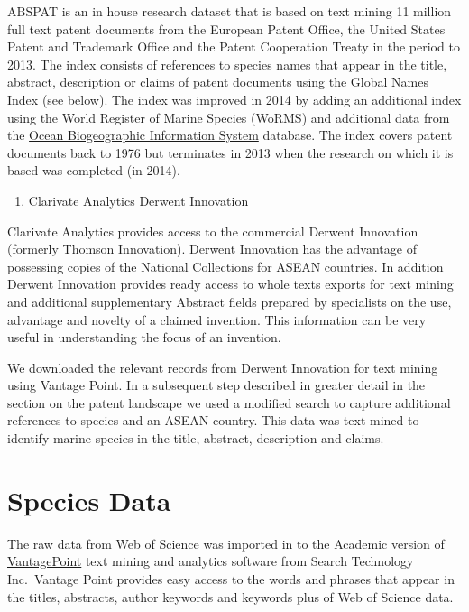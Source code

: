 \documentclass[]{book}
\providecommand{\tightlist}{%
  \setlength{\itemsep}{0pt}\setlength{\parskip}{0pt}}
\theoremstyle{definition}
\theoremstyle{definition}
\theoremstyle{definition}
\theoremstyle{remark}
\begin{document}
ABSPAT is an in house research dataset that is based on text mining 11
million full text patent documents from the European Patent Office, the
United States Patent and Trademark Office and the Patent Cooperation
Treaty in the period to 2013. The index consists of references to
species names that appear in the title, abstract, description or claims
of patent documents using the Global Names Index (see below). The index
was improved in 2014 by adding an additional index using the World
Register of Marine Species (WoRMS) and additional data from the
\href{http://www.iobis.org/}{Ocean Biogeographic Information System}
database. The index covers patent documents back to 1976 but terminates
in 2013 when the research on which it is based was completed (in 2014).

\begin{enumerate}
\def\labelenumi{\arabic{enumi}.}
\setcounter{enumi}{2}
\tightlist
\item
  Clarivate Analytics Derwent Innovation
\end{enumerate}

Clarivate Analytics provides access to the commercial Derwent Innovation
(formerly Thomson Innovation). Derwent Innovation has the advantage of
possessing copies of the National Collections for ASEAN countries. In
addition Derwent Innovation provides ready access to whole texts exports
for text mining and additional supplementary Abstract fields prepared by
specialists on the use, advantage and novelty of a claimed invention.
This information can be very useful in understanding the focus of an
invention.

We downloaded the relevant records from Derwent Innovation for text
mining using Vantage Point. In a subsequent step described in greater
detail in the section on the patent landscape we used a modified search
to capture additional references to species and an ASEAN country. This
data was text mined to identify marine species in the title, abstract,
description and claims.

\hypertarget{species-data}{%
\section{Species Data}\label{species-data}}

The raw data from Web of Science was imported in to the Academic version
of \href{https://thevantagepoint.com/}{VantagePoint} text mining and
analytics software from Search Technology Inc.~Vantage Point provides
easy access to the words and phrases that appear in the titles,
abstracts, author keywords and keywords plus of Web of Science data.
\end{document}
